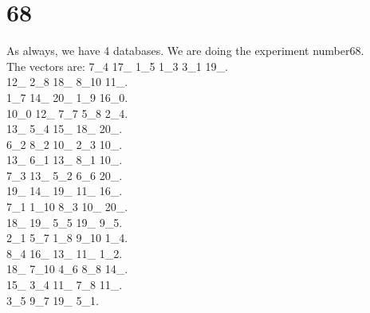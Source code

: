\chapter{68}
\indent As always, we have 4 databases. We are doing the experiment number68.\\
The vectors are:
7\_4 17\_ 1\_5 1\_3 3\_1 19\_.\\12\_ 2\_8 18\_ 8\_10 11\_.\\1\_7 14\_ 20\_ 1\_9 16\_0.\\10\_0 12\_ 7\_7 5\_8 2\_4.\\13\_ 5\_4 15\_ 18\_ 20\_.\\6\_2 8\_2 10\_ 2\_3 10\_.\\13\_ 6\_1 13\_ 8\_1 10\_.\\7\_3 13\_ 5\_2 6\_6 20\_.\\19\_ 14\_ 19\_ 11\_ 16\_.\\7\_1 1\_10 8\_3 10\_ 20\_.\\18\_ 19\_ 5\_5 19\_ 9\_5.\\2\_1 5\_7 1\_8 9\_10 1\_4.\\8\_4 16\_ 13\_ 11\_ 1\_2.\\18\_ 7\_10 4\_6 8\_8 14\_.\\15\_ 3\_4 11\_ 7\_8 11\_.\\3\_5 9\_7 19\_ 5\_1.\\